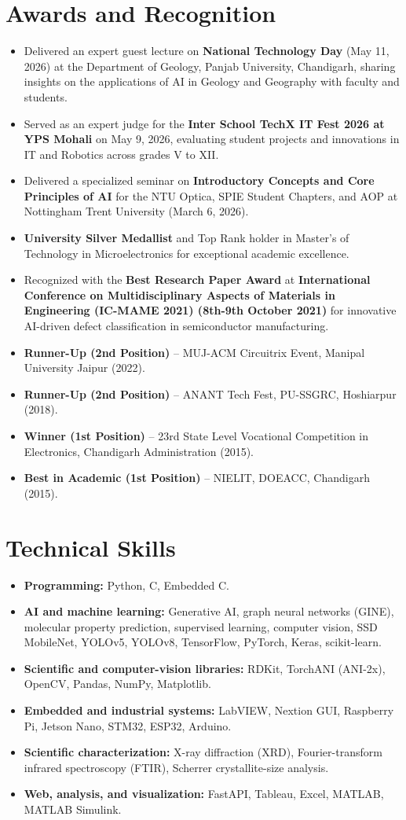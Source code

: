 \documentclass[a4paper,11pt]{article}
\newcommand{\cvbullet}[1]{\item #1}
\begin{document}
\section*{Awards and Recognition}
\begin{itemize}
  \cvbullet{Delivered an expert guest lecture on \textbf{National Technology Day} (May 11, 2026) at the Department of Geology, Panjab University, Chandigarh, sharing insights on the applications of AI in Geology and Geography with faculty and students.}
  \cvbullet{Served as an expert judge for the \textbf{Inter School TechX IT Fest 2026 at YPS Mohali} on May 9, 2026, evaluating student projects and innovations in IT and Robotics across grades V to XII.}
  \cvbullet{Delivered a specialized seminar on \textbf{Introductory Concepts and Core Principles of AI} for the NTU Optica, SPIE Student Chapters, and AOP at Nottingham Trent University (March 6, 2026).}
  \cvbullet{\textbf{University Silver Medallist} and Top Rank holder in Master's of Technology in Microelectronics for exceptional academic excellence.}
  \cvbullet{Recognized with the \textbf{Best Research Paper Award} at \textbf{International Conference on Multidisciplinary Aspects of Materials in Engineering (IC-MAME 2021) (8th-9th October 2021)} for innovative AI-driven defect classification in semiconductor manufacturing.}
  \cvbullet{\textbf{Runner-Up (2nd Position)} -- MUJ-ACM Circuitrix Event, Manipal University Jaipur (2022).}
  \cvbullet{\textbf{Runner-Up (2nd Position)} -- ANANT Tech Fest, PU-SSGRC, Hoshiarpur (2018).}
  \cvbullet{\textbf{Winner (1st Position)} -- 23rd State Level Vocational Competition in Electronics, Chandigarh Administration (2015).}
  \cvbullet{\textbf{Best in Academic (1st Position)} -- NIELIT, DOEACC, Chandigarh (2015).}
\end{itemize}

\section*{Technical Skills}
\begin{itemize}[label={}]
  \cvbullet{\textbf{Programming:} Python, C, Embedded C.}
  \cvbullet{\textbf{AI and machine learning:} Generative AI, graph neural networks (GINE), molecular property prediction, supervised learning, computer vision, SSD MobileNet, YOLOv5, YOLOv8, TensorFlow, PyTorch, Keras, scikit-learn.}
  \cvbullet{\textbf{Scientific and computer-vision libraries:} RDKit, TorchANI (ANI-2x), OpenCV, Pandas, NumPy, Matplotlib.}
  \cvbullet{\textbf{Embedded and industrial systems:} LabVIEW, Nextion GUI, Raspberry Pi, Jetson Nano, STM32, ESP32, Arduino.}
  \cvbullet{\textbf{Scientific characterization:} X-ray diffraction (XRD), Fourier-transform infrared spectroscopy (FTIR), Scherrer crystallite-size analysis.}
  \cvbullet{\textbf{Web, analysis, and visualization:} FastAPI, Tableau, Excel, MATLAB, MATLAB Simulink.}
\end{itemize}
\end{document}
